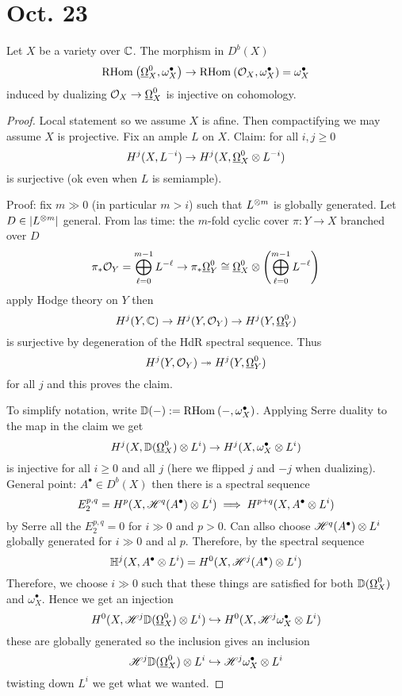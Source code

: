 \documentclass[12pt]{article}
\newcommand{\HH}{\mathbb{H}}
\begin{document}
\section{Oct. 23}

\begin{theorem}
Let $X$ be a variety over $\mathbb{C}$. The morphism in $D^b(X)$
\[ \mathrm{RHom}_{} \left( \underline{\Omega}_X^0, \omega_X^\bullet \right) \to \mathrm{RHom}_{} \left( \mathcal{O}_{X}, \omega_X^\bullet \right) = \omega_X^\bullet \]
induced by dualizing $\mathcal{O}_{X} \to \underline{\Omega}_X^0$ is injective on cohomology.
\end{theorem}

\newcommand{\DD}{\mathbb{D}}

\begin{proof}
Local statement so we assume $X$ is afine. Then compactifying we may assume $X$ is projective. Fix an ample $L$ on $X$. Claim: for all $i, j \ge 0$
\[ H^j(X, L^{-i}) \to H^j(X, \underline{\Omega}_X^0 \otimes L^{-i}) \]
is surjective (ok even when $L$ is semiample). 
\par
Proof: fix $m \gg 0$ (in particular $m > i$) such that $L^{\otimes m}$ is globally generated. Let $D \in |L^{\otimes m}|$ general. From las time: the $m$-fold cyclic cover $\pi : Y \to X$ branched over $D$ 
\[ \pi_* \mathcal{O}_{Y} = \bigoplus_{\ell = 0}^{m-1} L^{-\ell} \to \pi_* \underline{\Omega}_Y^0 \cong \underline{\Omega}_X^0 \otimes \left( \bigoplus_{\ell = 0}^{m-1} L^{- \ell} \right) \]
apply Hodge theory on $Y$ then
\[ H^j(Y, \mathbb{C}) \to H^j(Y, \mathcal{O}_{Y}) \to H^j(Y, \underline{\Omega}_Y^0) \]
is surjective by degeneration of the HdR spectral sequence. Thus
\[ H^j(Y, \mathcal{O}_{Y}) \twoheadrightarrow H^j(Y, \underline{\Omega}_Y^0) \]
for all $j$ and this proves the claim. 
\par 
To simplify notation, write $\DD(-) := \RHom{}{-}{\omega_X^\bullet}$. Applying Serre duality to the map in the claim we get 
\[ H^j(X, \DD(\ulO^0_X) \ot L^i) \to H^j(X, \omega_X^\bullet \ot L^i) \]
is injective for all $i \ge 0$ and all $j$ (here we flipped $j$ and $-j$ when dualizing). General point: $A^\bullet \in D^b(X)$ then there is a spectral sequence
\[ E^{p,q}_2 = H^p(X, \mathscr{H}^q(A^\bullet) \otimes L^i) \implies H^{p+q}(X, A^\bullet \otimes L^i) \]
by Serre all the $E^{p,q}_2 = 0$ for $i \gg 0$ and $p > 0$. Can allso choose $\mathscr{H}^q(A^\bullet) \otimes L^i$ globally generated for $i \gg 0$ and al $p$. Therefore, by the spectral sequence
\[ \HH^j(X, A^\bullet \ot L^i) = H^0(X, \H^j(A^\bullet) \ot L^i) \]
Therefore, we choose $i \gg 0$ such that these things are satisfied for both $\DD(\ulO_X^0)$ and $\omega_X^\bullet$. Hence we get an injection
\[ H^0(X, \H^j \DD(\ulO_X^0) \ot L^i) \embed H^0(X, \H^j \omega_X^\bullet \ot L^i) \]
these are globally generated so the inclusion gives an inclusion
\[ \H^j \DD(\ulO_X^0) \ot L^i \embed \H^j \omega_X^\bullet \ot L^i \]
twisting down $L^i$ we get what we wanted. 
\end{proof}
\end{document}
